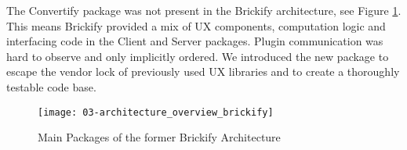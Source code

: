 \documentclass[../ClassicThesis.tex]{subfiles}
\begin{document}


The Convertify package was not present in the Brickify architecture, see Figure
\ref{fig:architecture_overview_brickify}. This means Brickify provided a mix of
UX components, computation logic and interfacing code in the Client and Server
packages. Plugin communication was hard to observe and only implicitly ordered.
We introduced the new package to escape the vendor lock of previously used UX
libraries and to create a thoroughly testable code base.

\begin{figure}
\label{fig:architecture_overview_brickify}
  \texttt{[image: 03-architecture\_overview\_brickify]}
  \caption{Main Packages of the former Brickify Architecture}
\end{figure}


\end{document}
